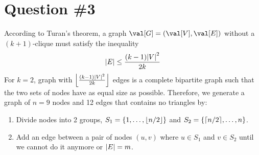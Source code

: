 \section{Question \#3}
According to Turan's theorem, a graph $\val[G]=(\val[V],\val[E])$ without a $(k+1)$-clique must satisfy the inequality
\begin{equation}
    \abs{E} \leq \frac{(k-1)\abs{V}^2}{2k}
\end{equation}
For $k=2$, graph with $\floor*{\frac{(k-1)\abs{V}^2}{2k}}$ edges is a complete bipartite graph such that the two sets of nodes have as equal size as possible. Therefore, we generate a graph of $n = 9$ nodes and 12 edges that contains no triangles by:
\begin{enumerate}
    \item Divide nodes into 2 groups, $S_1 = \cbracket{1,\ldots,\floor{n/2}}$ and $S_2 = \cbracket{\ceil{n/2},\ldots,n}$.
    \item Add an edge between a pair of nodes $(u,v)$ where $u \in S_1$ and $v \in S_2$ until we cannot do it anymore or $\abs{E} = m$.
\end{enumerate}


